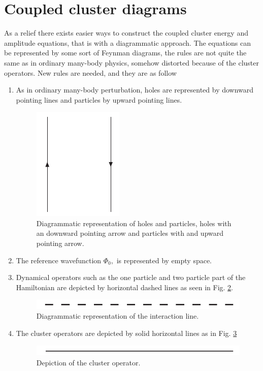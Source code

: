 \section{Coupled cluster diagrams}

As a relief there exists easier ways to construct the coupled 
cluster energy and amplitude equations, that is with a diagrammatic
approach. The equations can be represented by some sort of Feynman
diagrams, the rules are not quite the same as in ordinary many-body
physics, somehow distorted because of the cluster operators. 
New rules are needed, and they are as follow
\begin{enumerate}
\item As in ordinary many-body perturbation, holes are represented 
by downward pointing lines and particles by upward pointing lines.

\begin{figure}[htp]
\centering
\includegraphics[scale=0.75]{holepart}
\caption{Diagrammatic representation of holes and particles, holes 
with an downward pointing arrow and particles with and upward pointing arrow.}
\label{holepart}
\end{figure}

\item The reference wavefunction $\Phi_0,$ is represented by empty
 space.

\item Dynamical operators such as the one particle and two particle
part of the Hamiltonian are depicted by horizontal dashed lines as seen in Fig.
\ref{intline}.
\begin{figure}[htp]
\centering
\includegraphics[scale=0.75]{interaction}
\caption{Diagrammatic representation of the interaction line.}
\label{intline}
\end{figure}

\item The cluster operators are depicted by solid horizontal lines as in Fig. 
		\ref{clusterline}
\begin{figure}[htp]
\centering
\includegraphics[scale=0.75]{cluster}
\caption{Depiction of the cluster operator.}
\label{clusterline}
\end{figure}



\end{enumerate}
